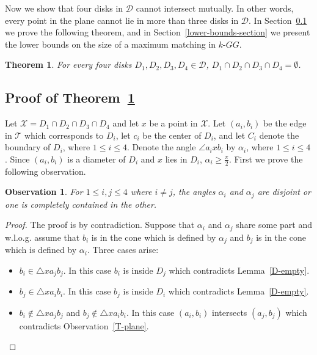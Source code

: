 \documentclass[11pt,a4paper]{article}
\newcommand{\kGG}[2]{$#1\text{-}GG#2$}
\newtheorem{theorem}{Theorem}
\newtheorem{observation}{Observation}
\begin{document}
Now we show that four disks in $\mathcal{D}$ cannot intersect mutually. In other words, every point in the plane cannot lie in more than three disks in $\mathcal{D}$. In Section~\ref{proof-section} we prove the following theorem, and in Section~\ref{lower-bounds-section} we present the lower bounds on the size of a maximum matching in \kGG{k}{}.

\begin{theorem}
 \label{four-circle-theorem}
For every four disks $D_1,D_2,D_3,D_4\in\mathcal{D}$, $D_1\cap D_2\cap D_3\cap D_4=\emptyset$.
\end{theorem}
\subsection{Proof of Theorem~\ref{four-circle-theorem}}
\label{proof-section}
Let $\mathcal{X}=D_1\cap D_2\cap D_3\cap D_4$  and let $x$ be a point in $\mathcal{X}$. Let $(a_i,b_i)$ be the edge in $\mathcal{T}$ which corresponds to $D_i$, let $c_i$ be the center of $D_i$, and let $C_i$ denote the boundary of $D_i$, where $1\le i\le 4$. Denote the angle $\angle a_ixb_i$ by $\alpha_i$, where $1\le i\le 4$. Since $(a_i,b_i)$ is a diameter of $D_i$ and $x$ lies in $D_i$, $\alpha_i \ge\frac{\pi}{2}$. First we prove the following observation.
\begin{observation}
\label{inclusion-exclusion}
 For $1\le i,j\le 4$ where $i\neq j$, the angles $\alpha_i$ and $\alpha_j$ are disjoint or one is completely contained in the other.
\end{observation}
\begin{proof}
The proof is by contradiction. Suppose that $\alpha_i$ and $\alpha_j$ share some part and w.l.o.g. assume that $b_i$ is in the cone which is defined by $\alpha_j$ and $b_j$ is in the cone which is defined by $\alpha_i$. Three cases arise:
\begin{itemize}
 \item $b_i\in\bigtriangleup xa_jb_j$. In this case $b_i$ is inside $D_j$ which contradicts Lemma~\ref{D-empty}.
 \item $b_j\in\bigtriangleup xa_ib_i$. In this case $b_j$ is inside $D_i$ which contradicts Lemma~\ref{D-empty}.
 \item $b_i\notin\bigtriangleup xa_jb_j$ and $b_j\notin\bigtriangleup xa_ib_i$. In this case $(a_i,b_i)$ intersects $(a_j,b_j)$ which contradicts Observation~\ref{T-plane}.
\end{itemize}
\end{proof}
\end{document}
